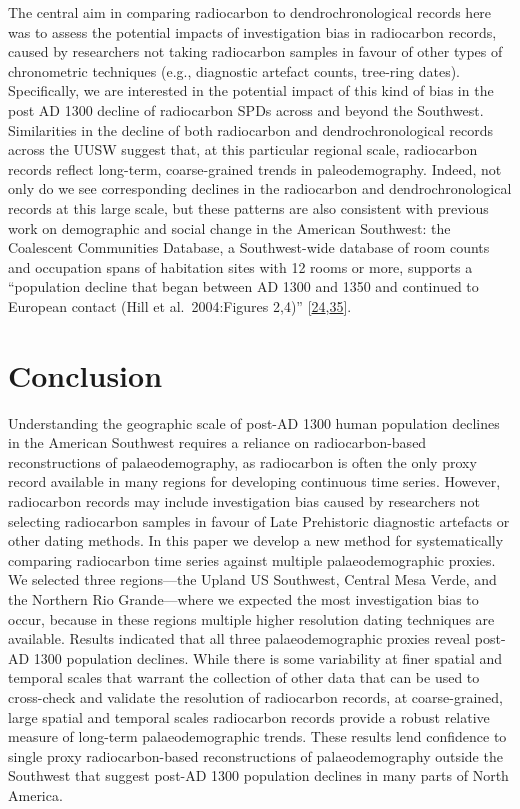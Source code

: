\documentclass[
]{sa}
\begin{document}
The central aim in comparing radiocarbon to dendrochronological records here was to assess the potential impacts of investigation bias in radiocarbon records, caused by researchers not taking radiocarbon samples in favour of other types of chronometric techniques (e.g., diagnostic artefact counts, tree-ring dates). Specifically, we are interested in the potential impact of this kind of bias in the post AD 1300 decline of radiocarbon SPDs across and beyond the Southwest. Similarities in the decline of both radiocarbon and dendrochronological records across the UUSW suggest that, at this particular regional scale, radiocarbon records reflect long-term, coarse-grained trends in paleodemography. Indeed, not only do we see corresponding declines in the radiocarbon and dendrochronological records at this large scale, but these patterns are also consistent with previous work on demographic and social change in the American Southwest: the Coalescent Communities Database, a Southwest-wide database of room counts and occupation spans of habitation sites with 12 rooms or more, supports a ``population decline that began between AD 1300 and 1350 and continued to European contact (Hill et al.~2004:Figures 2,4)'' {[}\protect\hyperlink{ref-Hill2004}{24},\protect\hyperlink{ref-Phillips2018}{35}{]}.

\hypertarget{conclusion}{%
\section*{Conclusion}\label{conclusion}}

Understanding the geographic scale of post-AD 1300 human population declines in the American Southwest requires a reliance on radiocarbon-based reconstructions of palaeodemography, as radiocarbon is often the only proxy record available in many regions for developing continuous time series. However, radiocarbon records may include investigation bias caused by researchers not selecting radiocarbon samples in favour of Late Prehistoric diagnostic artefacts or other dating methods. In this paper we develop a new method for systematically comparing radiocarbon time series against multiple palaeodemographic proxies. We selected three regions---the Upland US Southwest, Central Mesa Verde, and the Northern Rio Grande---where we expected the most investigation bias to occur, because in these regions multiple higher resolution dating techniques are available. Results indicated that all three palaeodemographic proxies reveal post-AD 1300 population declines. While there is some variability at finer spatial and temporal scales that warrant the collection of other data that can be used to cross-check and validate the resolution of radiocarbon records, at coarse-grained, large spatial and temporal scales radiocarbon records provide a robust relative measure of long-term palaeodemographic trends. These results lend confidence to single proxy radiocarbon-based reconstructions of palaeodemography outside the Southwest that suggest post-AD 1300 population declines in many parts of North America.
\end{document}
